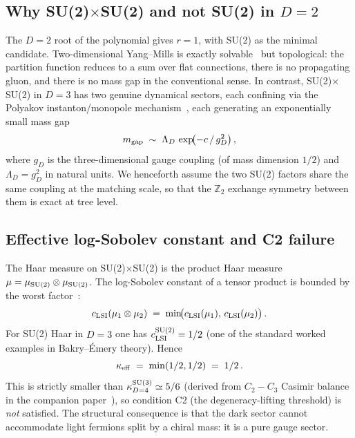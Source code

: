 \documentclass[aps,prd,twocolumn,nofootinbib,superscriptaddress,floatfix]{revtex4-2}
\begin{document}
\subsection{Why SU(2)$\times$SU(2) and not SU(2) in $D=2$}
The $D=2$ root of the polynomial gives $r=1$, with SU(2) as the minimal candidate. Two-dimensional Yang--Mills is exactly solvable~\cite{Migdal1975,Witten1991} but topological: the partition function reduces to a sum over flat connections, there is no propagating gluon, and there is no mass gap in the conventional sense. In contrast, SU(2)$\times$SU(2) in $D=3$ has two genuine dynamical sectors, each confining via the Polyakov instanton/monopole mechanism~\cite{Polyakov1977}, each generating an exponentially small mass gap
\begin{equation}
    m_{\rm gap} \;\sim\; \Lambda_D \,\exp\!\bigl(-c\,/\,g_D^2\bigr)\,,
\end{equation}
where $g_D$ is the three-dimensional gauge coupling (of mass dimension $1/2$) and $\Lambda_D = g_D^2$ in natural units. We henceforth assume the two SU(2) factors share the same coupling at the matching scale, so that the $\mathbb{Z}_2$ exchange symmetry between them is exact at tree level.

\subsection{Effective log-Sobolev constant and C2 failure}
The Haar measure on SU(2)$\times$SU(2) is the product Haar measure $\mu = \mu_{\rm SU(2)}\otimes\mu_{\rm SU(2)}$. The log-Sobolev constant of a tensor product is bounded by the worst factor~\cite{Gross1975}:
\begin{equation}
    c_{\rm LSI}(\mu_1\otimes\mu_2) \;=\; \min\!\bigl(c_{\rm LSI}(\mu_1),\,c_{\rm LSI}(\mu_2)\bigr)\,.
\end{equation}
For SU(2) Haar in $D=3$ one has $c_{\rm LSI}^{\rm SU(2)}=1/2$ (one of the standard worked examples in Bakry--\'Emery theory). Hence
\begin{equation}
    \kappa_{\rm eff} \;=\; \min(1/2,1/2) \;=\; 1/2\,.
\end{equation}
This is strictly smaller than $\kappa^{\rm SU(3)}_{D=4}\simeq 5/6$ (derived from $C_2-C_3$ Casimir balance in the companion paper~\cite{Remondiere2026companion}), so condition C2 (the degeneracy-lifting threshold) is \emph{not} satisfied. The structural consequence is that the dark sector cannot accommodate light fermions split by a chiral mass: it is a pure gauge sector.
\end{document}
